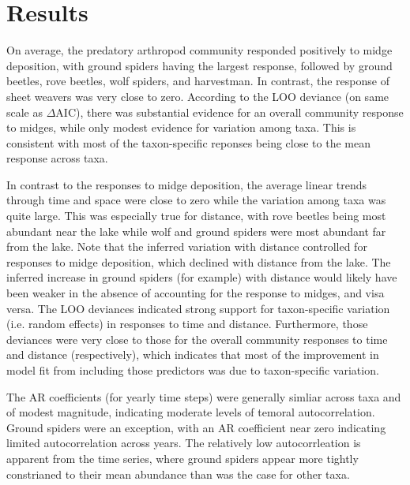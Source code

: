 

\section*{Results}

On average, the predatory arthropod community responded positively to midge deposition,
with ground spiders having the largest response,
followed by ground beetles, rove beetles, wolf spiders, and harvestman.
In contrast, the response of sheet weavers was very close to zero.
According to the LOO deviance (on same scale as $\Delta$AIC),
there was substantial evidence for an overall community response to midges,
while only modest evidence for variation among taxa. This is consistent with
most of the taxon-specific reponses being close to the mean response across taxa.

In contrast to the responses to midge deposition, the average linear trends through
time and space were close to zero while the variation among taxa was quite large.
This was especially true for distance, with rove beetles being most abundant near
the lake while wolf and ground spiders were most abundant far from the lake.
Note that the inferred variation with distance controlled for responses to midge
deposition, which declined with distance from the lake.
The inferred increase in ground spiders (for example) with distance
would likely have been weaker in the absence of accounting for the response to midges,
and visa versa.
The LOO deviances indicated strong support for taxon-specific variation
(i.e. random effects) in responses to time and distance.
Furthermore, those deviances were very close to those for the overall community
responses to time and distance (respectively), which indicates that most of the
improvement in model fit from including those predictors was due to taxon-specific
variation.

The AR coefficients (for yearly time steps) were generally simliar across taxa
and of modest magnitude, indicating moderate levels of temoral autocorrelation.
Ground spiders were an exception,
with an AR coefficient near zero indicating limited autocorrelation across years.
The relatively low autocorrleation is apparent from the time series,
where ground spiders appear more tightly constrianed to their mean abundance
than was the case for other taxa.

